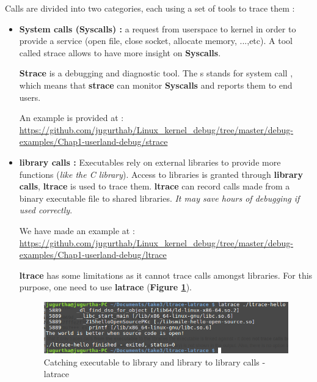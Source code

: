 Calls are divided into two categories, each using a set of tools to trace them :
\begin{itemize}

	\item \textbf{System calls (Syscalls) : } a request from userspace to kernel in order to provide a service (open file, close socket, allocate memory, ...,etc). A tool called strace allows to have more insight on \textbf{Syscalls}.
	
\textbf{Strace} is a debugging and diagnostic tool. The \og s \fg stands for \og system call \fg, which means that \textbf{strace} can monitor
\textbf{Syscalls} and reports them to end users.

An example is provided at : {\color{blue}\url{https://github.com/jugurthab/Linux_kernel_debug/tree/master/debug-examples/Chap1-userland-debug/strace}}

	\item \textbf{library calls : } Executables rely on external libraries to provide more functions (\textit{like the C library}). Access to libraries is granted through \textbf{library calls}, \textbf{ltrace} is used to trace them. 
\og \textbf{ltrace} \fg can record calls made from a binary executable file to shared libraries. \emph{It may save hours of debugging if used correctly}.
	
We have made an example at : {\color{blue}\url{https://github.com/jugurthab/Linux_kernel_debug/tree/master/debug-examples/Chap1-userland-debug/ltrace}}

\vspace{5px}
    
    
\begin{center}
\begin{mdframed}[
        linecolor=red,linewidth=2pt,%
        frametitlerule=true,%
        apptotikzsetting={\tikzset{mdfframetitlebackground/.append style={%
            shade,left color=white, right color=blue!20}}}, 
        frametitlerulecolor=blue,
        frametitlerulewidth=1pt, innertopmargin=\topskip,
        frametitle={About report},
        outerlinewidth=1.25pt
    ]
			\textbf{ltrace} has some limitations as it cannot trace calls amongst libraries. For this purpose, one need to use \textbf{latrace} (\textbf{Figure \ref{Catching executable to library and library to library calls - latrace}}).
			
			\begin{figure}[H]
		\centering
        \includegraphics[scale=0.40]{img/solution/latrace-output.png}
        \caption{Catching executable to library and library to library calls - latrace}
        \label{Catching executable to library and library to library calls - latrace}
    \end{figure}
\end{mdframed}
\end{center} 
 

\end{itemize}
